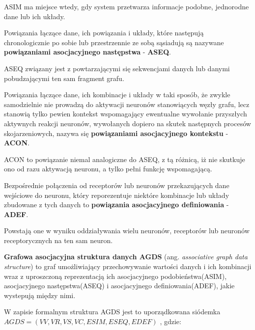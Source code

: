 ASIM ma miejsce wtedy, gdy system przetwarza informacje podobne, jednorodne dane lub ich układy.

\begin{definicja}
    Powiązania łączące dane, ich powiązania i układy, które następują chronologicznie po sobie lub przestrzennie ze sobą sąsiadują są nazywane
    \textbf{powiązaniami asocjacyjnego następstwa} - \textbf{ASEQ}.
\end{definicja}

ASEQ związany jest z powtarzającymi się sekwencjami danych lub danymi pobudzającymi ten sam fragment grafu.

\begin{definicja}
    Powiązania łączące dane, ich kombinacje i układy w taki sposób, że zwykle samodzielnie nie prowadzą do aktywacji neuronów stanowiących węzły
    grafu, lecz stanowią tylko pewien kontekst wspomagający ewentualne wywołanie przyszłych aktywnych reakcji neuronów, wywołanych dopiero na skutek
    następnych procesów skojarzeniowych, nazywa się \textbf{powiązaniami asocjacyjnego kontekstu} - \textbf{ACON}.
\end{definicja}

ACON to powiązanie niemal analogiczne do ASEQ, z tą różnicą, iż nie skutkuje ono od razu aktywacją neuronu, a tylko pełni funkcję wspomagającą.

\begin{definicja}
    Bezpośrednie połączenia od receptorów lub neuronów przekazujących dane wejściowe do neuronu, który reporezentuje niektóre kombinacje lub układy 
    zbudowane z tych danych to \textbf{powiązania asocjacyjnego definiowania} - \textbf{ADEF}.
\end{definicja}

Powstają one w wyniku oddziaływania wielu neuronów, receptorów lub neuronów receptorycznych na ten sam neuron.

\begin{definicja}
    \label{def:agds}
    \textbf{Grafowa asocjacyjna struktura danych AGDS} (ang. \emph{associative graph data structure}) to graf umożliwiający przechowywanie wartości danych
    i ich kombinacji wraz z uproszczoną reprezentacją ich asocjacyjnego podobieństwa(ASIM), asocjacyjnego następstwa(ASEQ) i asocjacyjnego definiowania(ADEF), jakie wystepują między nimi.
\end{definicja}

W zapisie formalnym struktura AGDS jest to uporządkowana siódemka \linebreak \(AGDS = (VV, VR, VS, VC, ESIM, ESEQ, EDEF) \) \cite[s. 109]{Horzyk}, gdzie:

